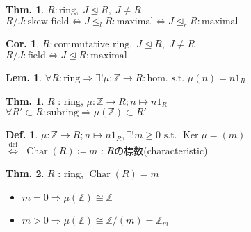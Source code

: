 \documentclass[uplatex,dvipdfmx,9pt]{beamer}
\newcommand{\defarrow}{\overset{\mathrm{def}}{\Leftrightarrow}}
\newcommand{\st}{\text{ s.t. }}
\newcommand{\Char}[1]{\operatorname{Char}(#1)}
\newcommand{\Ker}{\operatorname{Ker}}
\newcommand{\lideal}{\trianglelefteq_l}
\newcommand{\rideal}{\trianglelefteq_r}
\newcommand{\ideal}{\trianglelefteq}
\renewcommand{\hom}{\text{hom.}} %
\newcommand{\Z}{\mathbb{Z}}
\newcounter{textThmCount}
\newcounter{textLemCount}
\theoremstyle{definition} %
\newtheorem{defn}{Def.}[subsection] %
\newtheorem{thm}{Thm.}[subsection] %
\newtheorem{thmText}[textThmCount]{Thm.}
\newtheorem{corText}{Cor.}[textThmCount] %
\newtheorem{lemText}[textLemCount]{Lem.} %
\theoremstyle{example}
\begin{document}
\begin{frame}

  \begin{thmText}
    $R : \text{ring}, \; J \ideal R, \; J \neq R$ \\
    $R/J : \text{skew field} \Leftrightarrow J \lideal R : \text{maximal} \Leftrightarrow J \rideal R : \text{maximal}$
  \end{thmText}

  \begin{corText}
    $R : \text{commutative ring}, \; J \ideal R, \; J \neq R$ \\
    $R/J : \text{field} \Leftrightarrow J \ideal R : \text{maximal}$
  \end{corText}

\end{frame}

\begin{frame}

  \begin{lemText}
    $\forall R : \text{ring} \Rightarrow \exists! \mu\colon \Z \to R : \hom \st \mu(n) = n1_R$
  \end{lemText}

  \begin{thm}
    $R$ : ring, $\mu\colon \Z \to R ; n \mapsto n1_R$ \\
    $\forall R' \subset R : \text{subring} \Rightarrow \mu(\Z) \subset R'$
  \end{thm}

  \begin{defn}
    $\mu\colon \Z \to R ; n \mapsto n1_R, \exists! m \ge 0 \st \Ker\mu = (m)$ \\
    $\defarrow$ $\Char{R} \coloneqq m$ : $R$の\alert{標数(characteristic)}
  \end{defn}

  \begin{thm}
    $R$ : ring, $\Char{R} = m$
    \begin{itemize}
      \item $m = 0 \Rightarrow \mu(\Z) \cong \Z$
      \item $m > 0 \Rightarrow \mu(\Z) \cong \Z/(m) = \Z_m$
    \end{itemize}
  \end{thm}

\end{frame}
\end{document}
